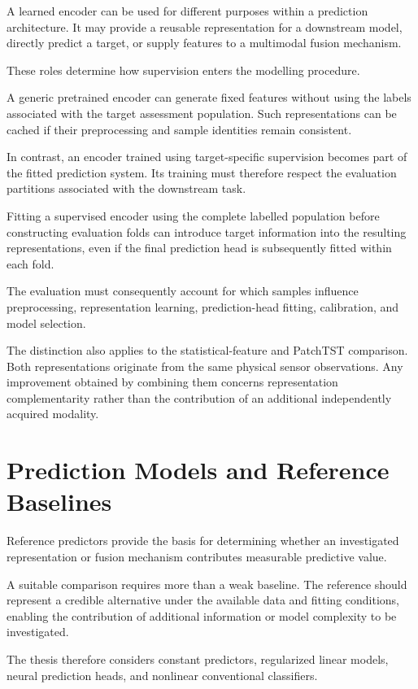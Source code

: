 A learned encoder can be used for different purposes within a prediction architecture. It may provide a reusable representation for a downstream model, directly predict a target, or supply features to a multimodal fusion mechanism.

These roles determine how supervision enters the modelling procedure.

A generic pretrained encoder can generate fixed features without using the labels associated with the target assessment population. Such representations can be cached if their preprocessing and sample identities remain consistent.

In contrast, an encoder trained using target-specific supervision becomes part of the fitted prediction system. Its training must therefore respect the evaluation partitions associated with the downstream task.

Fitting a supervised encoder using the complete labelled population before constructing evaluation folds can introduce target information into the resulting representations, even if the final prediction head is subsequently fitted within each fold.

The evaluation must consequently account for which samples influence preprocessing, representation learning, prediction-head fitting, calibration, and model selection.

The distinction also applies to the statistical-feature and PatchTST comparison. Both representations originate from the same physical sensor observations. Any improvement obtained by combining them concerns representation complementarity rather than the contribution of an additional independently acquired modality.

\section{Prediction Models and Reference Baselines}

Reference predictors provide the basis for determining whether an investigated representation or fusion mechanism contributes measurable predictive value.

A suitable comparison requires more than a weak baseline. The reference should represent a credible alternative under the available data and fitting conditions, enabling the contribution of additional information or model complexity to be investigated.

The thesis therefore considers constant predictors, regularized linear models, neural prediction heads, and nonlinear conventional classifiers.

